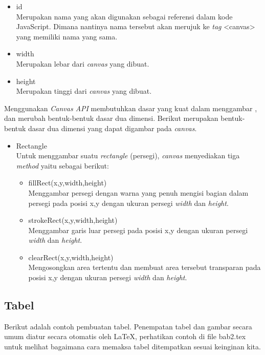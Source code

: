 \begin{itemize}
	\item id \\
	Merupakan nama yang akan digunakan sebagai referensi dalam kode JavaScript. Dimana nantinya nama tersebut akan merujuk ke \textit{tag} <canvas> yang memiliki nama yang sama.
	\item width \\
	Merupakan lebar dari \textit{canvas} yang dibuat.
	\item height \\
	Merupakan tinggi dari \textit{canvas} yang dibuat.
\end{itemize}

Menggunakan \textit{Canvas API} membutuhkan dasar yang kuat dalam menggambar , dan merubah bentuk-bentuk dasar dua dimensi. Berikut merupakan bentuk-bentuk dasar dua dimensi yang dapat digambar pada \textit{canvas}.

\begin{itemize}
	\item Rectangle \\
	Untuk menggambar suatu \textit{rectangle} (persegi), \textit{canvas} menyediakan tiga \textit{method} yaitu sebagai berikut:
	\begin{itemize}
		\item fillRect(x,y,width,height) \\
		Menggambar persegi dengan warna yang penuh mengisi bagian dalam persegi pada posisi x,y dengan ukuran persegi \textit{width} dan \textit{height}.
		\item strokeRect(x,y,width,height) \\
		Menggambar garis luar persegi pada posisi x,y dengan ukuran persegi \textit{width} dan \textit{height}.
		\item clearRect(x,y,width,height) \\
		Mengosongkan area tertentu dan membuat area tersebut transparan pada posisi x,y dengan ukuran persegi \textit{width} dan \textit{height}.
	\end{itemize}

\end{itemize}

\subsection{Tabel}  
Berikut adalah contoh pembuatan tabel. 
Penempatan tabel dan gambar secara umum diatur secara otomatis oleh \LaTeX{}, perhatikan contoh di file bab2.tex untuk melihat bagaimana cara memaksa tabel ditempatkan sesuai keinginan kita.

